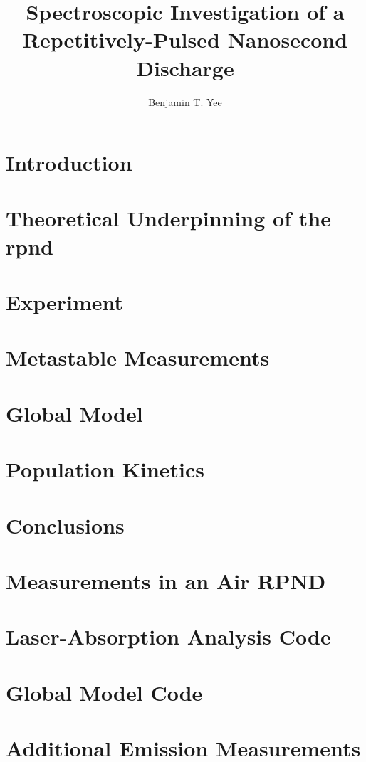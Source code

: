 \documentclass[12pt]{./tex/thesis-umich}
\title{Spectroscopic Investigation of a Repetitively-Pulsed Nanosecond Discharge}
\author{Benjamin T. Yee}
\begin{document}
  \chapter{Introduction}\label{chp:introduction}
    
  
    \chapter{Theoretical Underpinning of the \acs{rpnd}}\label{chp:theory}
    

  \chapter{Experiment}\label{chp:experiment}
    

  \chapter{Metastable Measurements}\label{chp:metastables}
    
  
  \chapter{Global Model}\label{chp:modeling}
    

  \chapter{Population Kinetics}\label{chp:emissions}
    

  \chapter{Conclusions}\label{chp:conclusions}
    

  \appendix
    \chapter{Measurements in an Air RPND}\label{chp:nasa}
      

    \chapter{Laser-Absorption Analysis Code}\label{chp:lasana}
      

    \chapter{Global Model Code}\label{chp:crammer}
      

    \chapter{Additional Emission Measurements}\label{chp:extraem}
      

  \begingroup
    \printbibliography
  \endgroup
\end{document}
